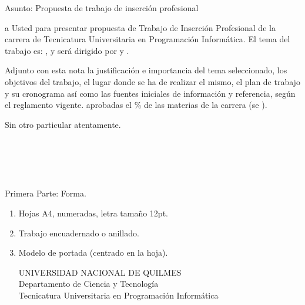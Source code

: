 \hrulefill

Asunto: Propuesta de trabajo de inserción profesional

 a Usted para presentar 
propuesta de Trabajo de Inserción Profesional de la carrera de Tecnicatura
Universitaria en Programación Informática. El tema del trabajo es: , y será dirigido por  y .

Adjunto con esta nota la justificación e importancia del tema
seleccionado, los objetivos del trabajo, el lugar donde se ha de realizar el
mismo, el plan de trabajo y su cronograma así como las fuentes iniciales de
información y referencia, según el reglamento vigente. 
aprobadas el \%  de las materias de la carrera (se
).

Sin otro particular  atentamente.\\ \\
\\
\\
\\
\\

\newpage
{}
Primera Parte: Forma.
\begin{enumerate}
\item Hojas A4, numeradas, letra tamaño 12pt.
\item Trabajo encuadernado o anillado.
\item Modelo de portada (centrado en la hoja).
\begin{center}
UNIVERSIDAD NACIONAL DE QUILMES\\
Departamento de Ciencia y Tecnología\\
Tecnicatura Universitaria en Programación Informática\\

\\
\\
\\
\\
\end{center}
\end{enumerate}

